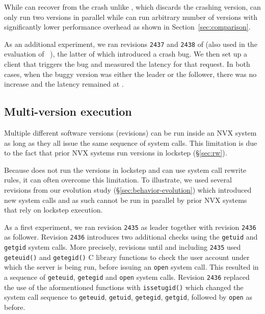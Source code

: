 While \mx can recover from the crash unlike \varan, which discards the crashing
version, \mx can only run two versions in parallel while \varan can run
arbitrary number of versions with significantly lower performance overhead as
shown in Section~\ref{sec:comparison}.

As an additional experiment, we ran revisions \lstinline`2437` and
\lstinline`2438` of \lighttpd (also used in the evaluation of
\mx~\cite{mx}), the latter of which introduced a crash bug.  We then
set up a client that triggers the bug and measured the latency for
that request. In both cases, \ie when the buggy version was either
the leader or the follower, there was no increase and the latency remained
at \lighttpdnormallatency.

\subsection{Multi-version execution}
\label{sec:mv-execution}

Multiple different software versions (revisions) can be run inside an NVX
system as long as they all issue the same sequence of system calls. This
limitation is due to the fact that prior NVX systems run versions in lockstep
(\S\ref{sec:rw}).

Because \varan does not run the versions in lockstep and can use system call
rewrite rules, it can often overcome this limitation. To illustrate, we used
several \lighttpd revisions from our evolution study
(\S\ref{sec:behavior-evolution}) which introduced new system calls and as such
cannot be run in parallel by prior NVX systems that rely on lockstep execution.

As a first experiment, we ran revision \lstinline`2435` as
leader together with revision \lstinline`2436` as follower.  Revision
\lstinline`2436` introduces two additional checks using the
\lstinline`getuid` and \lstinline`getgid` system calls.  More
precisely, revisions until and including \lstinline`2435` used
\lstinline`geteuid()` and \lstinline`getegid()` C library functions to
check the user account under which the server is being run, before
issuing an \lstinline`open` system call.  This resulted in a sequence
of \lstinline`geteuid`, \lstinline`getegid` and \lstinline`open`
system calls.  Revision \lstinline`2436` replaced the use of the
aformentioned functions with \lstinline`issetugid()` which changed the
system call sequence to \lstinline`geteuid`, \lstinline`getuid`,
\lstinline`getegid`, \lstinline`getgid`, followed by \lstinline`open`
as before.

